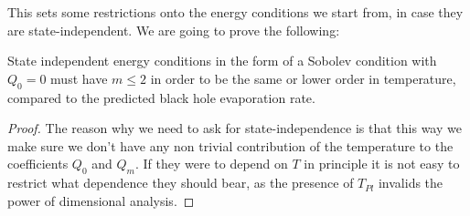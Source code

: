This sets some restrictions onto the energy conditions we start from, in case they are state-independent. We are going to prove the following:
\begin{prop}
	State independent energy conditions in the form of a Sobolev condition with \(Q_0 = 0 \) must have \(m \le 2\) in order to be the same or lower order in temperature, compared to the predicted black hole evaporation rate.
\end{prop}
\begin{proof}
	The reason why we need to ask for state-independence is that this way we make sure we don't have any non trivial contribution of the temperature to the coefficients \(Q_0\) and \(Q_m\). If they were to depend on \(T\) in principle it is not easy to restrict what dependence they should bear, as the presence of \(T_{Pl}\) invalids the power of dimensional analysis.


\end{proof}
